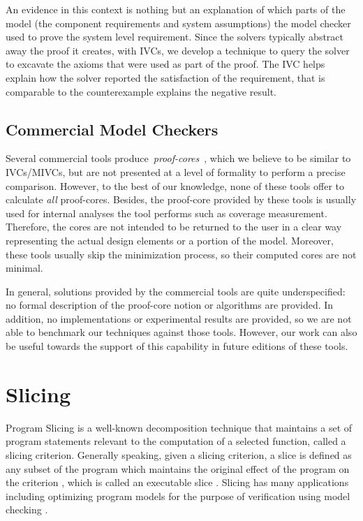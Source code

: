 An evidence in this context is nothing but an
explanation of which parts of the model (the component requirements and system assumptions) the
model checker used to prove the system level requirement. Since the solvers typically abstract away the proof it creates, with IVCs, we develop a technique to query the solver to excavate the axioms that were used as part of the proof. The IVC helps explain how the solver reported the satisfaction of the requirement, that is comparable to the counterexample explains the negative result.



\subsection{Commercial Model Checkers}
Several commercial tools produce~\emph{proof-cores}~\cite{hanna2015formal, jasper_gold}, which we believe to be similar to IVCs/MIVCs, but are not presented at a level of formality to perform a precise comparison.  However, to the best of our knowledge, none of these tools offer to calculate \emph{all} proof-cores. Besides, the proof-core provided by these tools is usually used for internal analyses the tool performs such as coverage measurement. Therefore, the cores are not intended to be returned to the user in a clear way representing the actual design elements or a portion of the model. Moreover, these tools usually skip the minimization process, so their computed cores are not minimal.

In general, solutions provided by the commercial tools are quite underspecified:
no formal description of the proof-core notion or algorithms are provided. In addition, no implementations or experimental results are provided, so we are not able to benchmark our techniques against those tools. However, our work can also be useful towards the support of this capability in future editions of these tools.

\section{Slicing}

Program  Slicing  is  a  well-known  decomposition  technique  that  maintains a
set of program statements  relevant to  the computation  of a  selected  function, called a slicing criterion. Generally speaking, given a slicing criterion, a slice is defined
 as any subset of the program which maintains the original effect of the program on the criterion \cite{Weiser97}, which is called an executable slice \cite{Androutsopoulos}.
  Slicing has many applications including optimizing program models
   for the purpose of verification using model checking \cite{Androutsopoulos, Jhala:2005, Dwyer:2006}.


